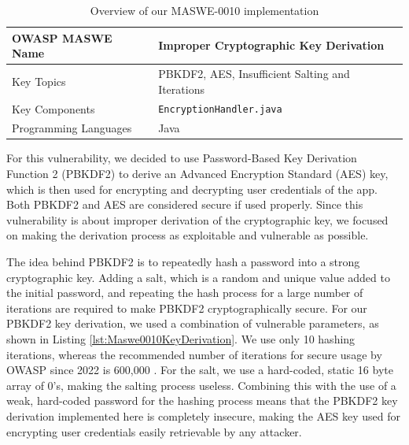 \begin{table}[H]
\centering
\renewcommand{\arraystretch}{1.3}
\begin{tabular}{p{5cm} p{8cm}} 
\toprule
OWASP MASWE Name & Improper Cryptographic Key Derivation \\ 
\midrule
Key Topics & PBKDF2, AES, Insufficient Salting and Iterations \\
Key Components & \texttt{EncryptionHandler.java} \\
Programming Languages & Java \\ 
\bottomrule
\end{tabular}
\caption{Overview of our MASWE-0010 implementation}
\label{tab:maswe-0010}
\end{table}

For this vulnerability, we decided to use Password-Based Key Derivation Function 2 (PBKDF2) to derive an Advanced Encryption Standard (AES) key, which is then used for encrypting and decrypting user credentials of the app. Both PBKDF2 and AES are considered secure if used properly. Since this vulnerability is about improper derivation of the cryptographic key, we focused on making the derivation process as exploitable and vulnerable as possible.

The idea behind PBKDF2 is to repeatedly hash a password into a strong cryptographic key. Adding a salt, which is a random and unique value added to the initial password, and repeating the hash process for a large number of iterations are required to make PBKDF2 cryptographically secure. For our PBKDF2 key derivation, we used a combination of vulnerable parameters, as shown in Listing \ref{lst:Maswe0010KeyDerivation}. We use only 10 hashing iterations, whereas the recommended number of iterations for secure usage by OWASP since 2022 is 600,000 \cite{owasp_password_storage_cheatsheet}. For the salt, we use a hard-coded, static 16 byte array of 0's, making the salting process useless. Combining this with the use of a weak, hard-coded password for the hashing process means that the PBKDF2 key derivation implemented here is completely insecure, making the AES key used for encrypting user credentials easily retrievable by any attacker.

